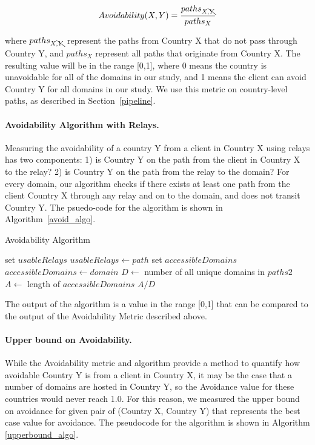 \[Avoidability(X,Y) = \frac{paths_{X,\bcancel{Y}}}{paths_{X}}\]

\noindent where $paths_{X,\bcancel{Y}}$ represent the paths from Country X that do not pass through Country Y, and $paths_{X}$ represent all paths that originate from Country X. The resulting value will be in the range [0,1], where 0 means the country is unavoidable for all of the domains in our study, and 1 means the client can avoid Country Y for all domains in our study.  We use this metric on country-level paths, as described in Section~\ref{pipeline}.

\paragraph{Avoidability Algorithm with Relays.}  Measuring the avoidability of a country Y from a client in Country X using relays has two components: 1) is Country Y on the path from the client in Country X to the relay?  2) is Country Y on the path from the relay to the domain?  For every domain, our algorithm checks if there exists at least one path from the client Country X through any relay and on to the domain, and does not transit Country Y.  The psuedo-code for the algorithm is shown in Algorithm~\ref{avoid_algo}.

\begin{algorithm}[t]
\caption{Avoidability Algorithm}
\label{avoid_algo}
\begin{algorithmic}[1]
    \State set $usableRelays$
		\State $usableRelays \gets path$
	\EndIf
    \EndFor
    \State set $accessibleDomains$
        \State $accessibleDomains \gets domain$
        \EndIf
    \EndIf
    \EndFor
    \State $D \gets$ number of all unique domains in $paths2$
    \State $A \gets$ length of $accessibleDomains$
    \State \Return $A / D$
\EndFunction
\end{algorithmic}
\end{algorithm}

The output of the algorithm is a value in the range [0,1] that can be compared to the output of the Avoidability Metric described above.  

\paragraph{Upper bound on Avoidability.}  While the Avoidability metric and algorithm provide a method to quantify how avoidable Country Y is from a client in Country X, it may be the case that a number of domains are hosted in Country Y, so the Avoidance value for these countries would never reach 1.0.  For this reason, we measured the upper bound on avoidance for given pair of (Country X, Country Y) that represents the best case value for avoidance.  The pseudocode for the algorithm is shown in Algorithm \ref{upperbound_algo}.

